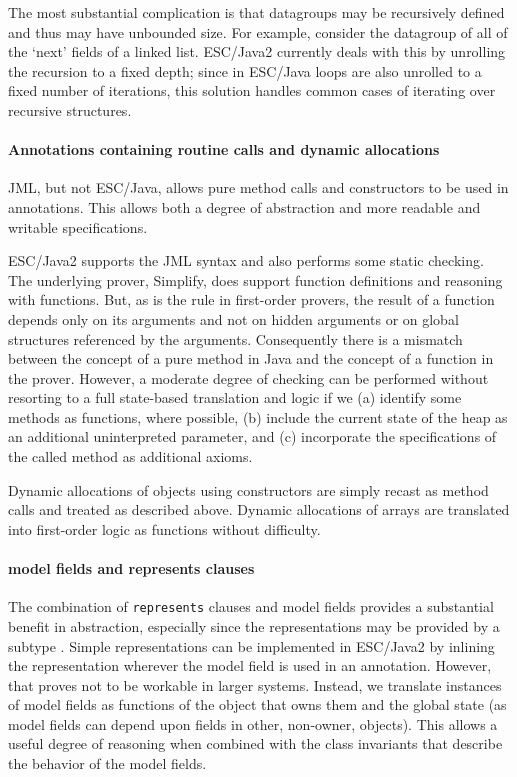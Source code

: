 \documentclass{llncs}
\begin{document}
The most substantial complication is that datagroups may be
recursively defined and thus may have unbounded size.  For example,
consider the datagroup of all of the `next' fields of a linked list.
ESC/Java2 currently deals with this by unrolling the recursion to a
fixed depth; since in ESC/Java loops are also unrolled to a fixed
number of iterations, this solution handles common cases of iterating
over recursive structures.

\paragraph*{Annotations containing routine calls and dynamic allocations}
JML, but not ESC/Java, allows pure method calls and constructors to be
used in annotations.  This allows both a degree of abstraction and
more readable and writable specifications.

ESC/Java2 supports the JML syntax and also performs some static
checking.  The underlying prover, Simplify, does support function
definitions and reasoning with functions.  But, as is the rule in
first-order provers, the result of a function depends only on its
arguments and not on hidden arguments or on global structures
referenced by the arguments.  Consequently there is a mismatch between
the concept of a pure method in Java and the concept of a function in
the prover.  However, a moderate degree of checking can be performed
without resorting to a full state-based translation and logic if we
(a) identify some methods as functions, where possible, (b) include
the current state of the heap as an additional uninterpreted
parameter, and (c) incorporate the specifications of the called method
as additional axioms.

Dynamic allocations of objects using constructors are simply recast as
method calls and treated as described above.  Dynamic allocations of
arrays are translated into first-order logic as functions without
difficulty.

\paragraph*{model fields and represents clauses}
The combination of \texttt{represents} clauses and model fields
provides a substantial benefit in abstraction, especially since the
representations may be provided by a subtype \cite{Cheon-etal03}.
Simple representations can be implemented in ESC/Java2 by inlining the
representation wherever the model field is used in an annotation.
However, that proves not to be workable in larger systems.  Instead,
we translate instances of model fields as functions of the object that
owns them and the global state (as model fields can depend upon fields
in other, non-owner, objects).  This allows a useful degree of
reasoning when combined with the class invariants that describe the
behavior of the model fields.
\end{document}
